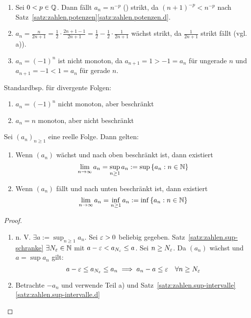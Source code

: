 \documentclass[12pt]{scrreprt}
\begin{document}
\begin{bsp}
\label{bsp:konv.monotonie}
\begin{enumerate}
\item Sei $0<p\in\mathbb{Q}$. Dann fällt $a_n=n^{-p}$ () strikt, da $(n+1)^{-p}<n^{-p}$ nach Satz~\ref{satz:zahlen.potenzen}\ref{satz:zahlen.potenzen.d}.
\item $a_n = \frac{n}{2n+1} = \frac12\cdot\frac{2n+1-1}{2n+1} = \frac12 - \frac12\cdot\frac{1}{2n+1}$ wächst strikt, da $\frac{1}{2n+1}$ strikt fällt (vgl. a)).
\item $a_n=(-1)^n$ ist nicht monoton, da $a_{n+1}=1>-1=a_n$ für ungerade $n$ und $a_{n+1}=-1<1=a_n$ für gerade $n$.
\end{enumerate}
\end{bsp}

\noindent Standardbsp. für divergente Folgen:
\begin{enumerate}
\item $a_n=(-1)^n$ nicht monoton, aber beschränkt
\item $a_n=n$ monoton, aber nicht beschränkt
\end{enumerate}

\begin{thm}
\label{thm:konv.mon-beschr}
Sei $(a_n)_{n\ge1}$ eine reelle Folge. Dann gelten:
\begin{enumerate}
\item Wenn $(a_n)$ wächst und nach oben beschränkt ist, dann existiert
\[\lim_{n\rightarrow\infty}{a_n}=\sup_{n\ge1}{a_n}:=\sup{\{a_n:\ensuremath{n\in\mathbb{N}}\}}\]
\label{thm:konv.mon-beschr.a}
\item Wenn $(a_n)$ fällt und nach unten beschränkt ist, dann existiert
\[\lim_{n\rightarrow\infty}{a_n}=\inf_{n\ge1}{a_n}:=\inf{\{a_n:\ensuremath{n\in\mathbb{N}}\}}\]
\label{thm:konv.mon-beschr.b}
\end{enumerate}
\end{thm}
\begin{proof}
\begin{enumerate}
\item n. V. $\exists a:=\sup_{n\ge1}{a_n}$. Sei $\varepsilon>0$ beliebig gegeben. Satz~\ref{satz:zahlen.sup-schranke} \folgt $\exists N_\varepsilon\in\mathbb{N}$ mit $a-\varepsilon < a_{N_\varepsilon}\le a$. Sei $n\ge N_\varepsilon$. Da $(a_n)$ wächst und $a=\sup{a_n}$ gilt:
\[a-\varepsilon \le a_{N_\varepsilon} \le a_n \implies a_n-a \le \varepsilon \quad \forall n\ge N_\varepsilon\]
\item Betrachte $-a_n$ und verwende Teil a) und Satz~\ref{satz:zahlen.sup-intervalle}\ref{satz:zahlen.sup-intervalle.d}
\end{enumerate}
\end{proof}
\end{document}

